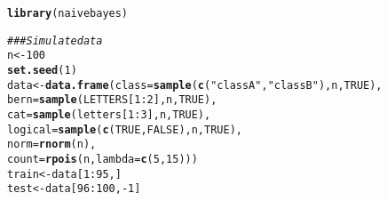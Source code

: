 \documentclass{article}\usepackage[]{graphicx}\usepackage[]{color}
\makeatletter
\newcommand{\hlnum}[1]{\textcolor[rgb]{0.686,0.059,0.569}{#1}}%
\newcommand{\hlstr}[1]{\textcolor[rgb]{0.192,0.494,0.8}{#1}}%
\newcommand{\hlcom}[1]{\textcolor[rgb]{0.678,0.584,0.686}{\textit{#1}}}%
\newcommand{\hlopt}[1]{\textcolor[rgb]{0,0,0}{#1}}%
\newcommand{\hlstd}[1]{\textcolor[rgb]{0.345,0.345,0.345}{#1}}%
\newcommand{\hlkwb}[1]{\textcolor[rgb]{0.69,0.353,0.396}{#1}}%
\newcommand{\hlkwc}[1]{\textcolor[rgb]{0.333,0.667,0.333}{#1}}%
\newcommand{\hlkwd}[1]{\textcolor[rgb]{0.737,0.353,0.396}{\textbf{#1}}}%
\newenvironment{kframe}{%
 \def\at@end@of@kframe{}%
 \ifinner\ifhmode%
  \def\at@end@of@kframe{\end{minipage}}%
  \begin{minipage}{\columnwidth}%
 \fi\fi%
 \def\FrameCommand##1{\hskip\@totalleftmargin \hskip-\fboxsep
 \colorbox{shadecolor}{##1}\hskip-\fboxsep
     \hskip-\linewidth \hskip-\@totalleftmargin \hskip\columnwidth}%
 \MakeFramed {\advance\hsize-\width
   \@totalleftmargin\z@ \linewidth\hsize
   \@setminipage}}%
 {\par\unskip\endMakeFramed%
 \at@end@of@kframe}
\newenvironment{knitrout}{}{} %
\makeatother
\begin{document}
\begin{knitrout}
\color{fgcolor}\begin{kframe}
\begin{alltt}
\hlkwd{library}\hlstd{(naivebayes)}
\end{alltt}


{\ttfamily\noindent\itshape\color{messagecolor}{\#\# ::: naivebayes 0.9.7 loaded}}\begin{alltt}
\hlcom{### Simulate data}
\hlstd{n} \hlkwb{<-} \hlnum{100}
\hlkwd{set.seed}\hlstd{(}\hlnum{1}\hlstd{)}
\hlstd{data} \hlkwb{<-} \hlkwd{data.frame}\hlstd{(}\hlkwc{class} \hlstd{=} \hlkwd{sample}\hlstd{(}\hlkwd{c}\hlstd{(}\hlstr{"classA"}\hlstd{,} \hlstr{"classB"}\hlstd{), n,} \hlnum{TRUE}\hlstd{),}
                   \hlkwc{bern} \hlstd{=} \hlkwd{sample}\hlstd{(LETTERS[}\hlnum{1}\hlopt{:}\hlnum{2}\hlstd{], n,} \hlnum{TRUE}\hlstd{),}
                   \hlkwc{cat}  \hlstd{=} \hlkwd{sample}\hlstd{(letters[}\hlnum{1}\hlopt{:}\hlnum{3}\hlstd{], n,} \hlnum{TRUE}\hlstd{),}
                   \hlkwc{logical} \hlstd{=} \hlkwd{sample}\hlstd{(}\hlkwd{c}\hlstd{(}\hlnum{TRUE}\hlstd{,}\hlnum{FALSE}\hlstd{), n,} \hlnum{TRUE}\hlstd{),}
                   \hlkwc{norm} \hlstd{=} \hlkwd{rnorm}\hlstd{(n),}
                   \hlkwc{count} \hlstd{=} \hlkwd{rpois}\hlstd{(n,} \hlkwc{lambda} \hlstd{=} \hlkwd{c}\hlstd{(}\hlnum{5}\hlstd{,}\hlnum{15}\hlstd{)))}
\hlstd{train} \hlkwb{<-} \hlstd{data[}\hlnum{1}\hlopt{:}\hlnum{95}\hlstd{, ]}
\hlstd{test} \hlkwb{<-} \hlstd{data[}\hlnum{96}\hlopt{:}\hlnum{100}\hlstd{,} \hlopt{-}\hlnum{1}\hlstd{]}



\end{alltt}
\end{kframe}
\end{knitrout}
\end{document}

